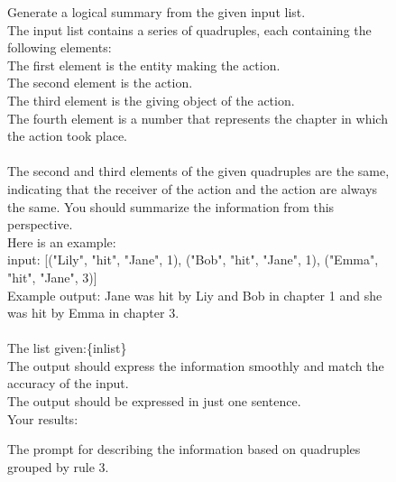 \begin{figure}[htbp]
\centering
\begin{tcolorbox}
Generate a logical summary from the given input list. \\
The input list contains a series of quadruples, each containing the following elements:\\
The first element is the entity making the action.\\
The second element is the action.\\
The third element is the giving object of the action.\\
The fourth element is a number that represents the chapter in which the action took place.\\
\\
The second and third elements of the given quadruples are the same, indicating that the receiver of the action and the action are always the same. You should summarize the information from this perspective.\\
Here is an example:\\
input: [("Lily", "hit", "Jane", 1), ("Bob", "hit", "Jane", 1), ("Emma", "hit", "Jane", 3)]\\
Example output: Jane was hit by Liy and Bob in chapter 1 and she was hit by Emma in chapter 3.\\
\\
The list given:\{inlist\}\\
The output should express the information smoothly and match the accuracy of the input.\\
The output should be expressed in just one sentence.\\
Your results:\\
\end{tcolorbox}
\caption{The prompt for describing the information based on quadruples grouped by rule 3.}
\label{tab:group trans3}
\end{figure}

